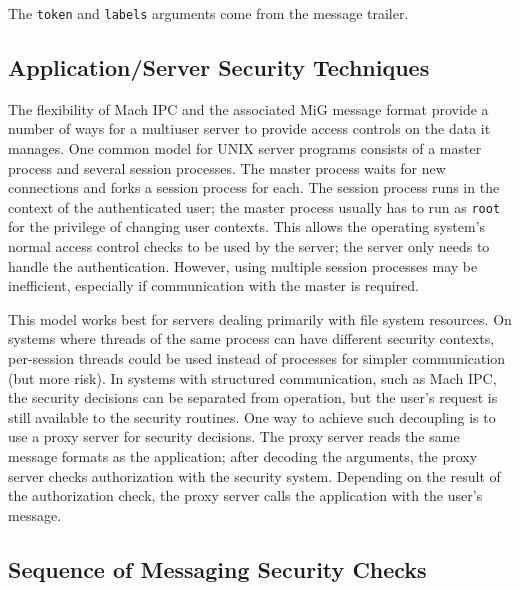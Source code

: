 The {\tt token} and {\tt labels} arguments come from the message trailer.

\subsection{Application/Server Security Techniques}

The flexibility of Mach IPC and the associated MiG message format provide a number
of ways for a multiuser server to provide access controls on the data it manages.
One common model for UNIX server programs consists of a master process and several
session processes. The master process waits for new connections and forks a session process
for each. The session process runs in the context of the authenticated user; the master
process usually has to run as {\tt root} for the privilege of changing user contexts.
This allows the operating system's normal access control checks to be used by the server;
the server only needs to handle the authentication.  However, using multiple session processes may
be inefficient, especially if communication with the master is required.

This model works
best for servers dealing primarily with file system resources. On systems where threads of the
same process can have different security contexts, per-session threads could be used instead
of processes for simpler communication (but more risk). In systems with structured
communication, such as Mach IPC, the security decisions can be separated from operation,
but the user's request is still available to the security routines. One way to achieve
such decoupling is to use a proxy server for security decisions. The proxy server reads
the same message formats as the application; after decoding the arguments, the proxy
server checks authorization with the security system. Depending on the result of the
authorization check, the proxy server calls the application with the user's message.


\subsection{Sequence of Messaging Security Checks}

